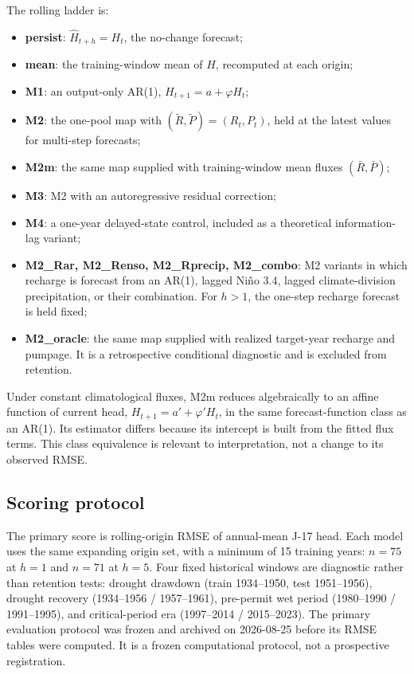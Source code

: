 \documentclass[11pt]{article}
\begin{document}
The rolling ladder is:
\begin{itemize}[leftmargin=1.5em]
\item \textbf{persist}: \(\widehat H_{t+h}=H_t\), the no-change forecast;
\item \textbf{mean}: the training-window mean of \(H\), recomputed at each origin;
\item \textbf{M1}: an output-only AR(1), \(H_{t+1}=a+\varphi H_t\);
\item \textbf{M2}: the one-pool map with \((\widetilde R,\widetilde P)=(R_t,P_t)\), held at the latest values for multi-step forecasts;
\item \textbf{M2m}: the same map supplied with training-window mean fluxes \((\bar R,\bar P)\);
\item \textbf{M3}: M2 with an autoregressive residual correction;
\item \textbf{M4}: a one-year delayed-state control, included as a theoretical information-lag variant;
\item \textbf{M2\_Rar, M2\_Renso, M2\_Rprecip, M2\_combo}: M2 variants in which recharge is forecast from an AR(1), lagged Niño 3.4, lagged climate-division precipitation, or their combination. For \(h>1\), the one-step recharge forecast is held fixed;
\item \textbf{M2\_oracle}: the same map supplied with realized target-year recharge and pumpage. It is a retrospective conditional diagnostic and is excluded from retention.
\end{itemize}

Under constant climatological fluxes, M2m reduces algebraically to an affine function of current head, \(H_{t+1}=a'+\varphi'H_t\), in the same forecast-function class as an AR(1). Its estimator differs because its intercept is built from the fitted flux terms. This class equivalence is relevant to interpretation, not a change to its observed RMSE.

\subsection{Scoring protocol}

The primary score is rolling-origin RMSE of annual-mean J-17 head. Each model uses the same expanding origin set, with a minimum of 15 training years: \(n=75\) at \(h=1\) and \(n=71\) at \(h=5\). Four fixed historical windows are diagnostic rather than retention tests: drought drawdown (train 1934--1950, test 1951--1956), drought recovery (1934--1956 / 1957--1961), pre-permit wet period (1980--1990 / 1991--1995), and critical-period era (1997--2014 / 2015--2023). The primary evaluation protocol was frozen and archived on 2026-08-25 before its RMSE tables were computed. It is a frozen computational protocol, not a prospective registration.
\end{document}
